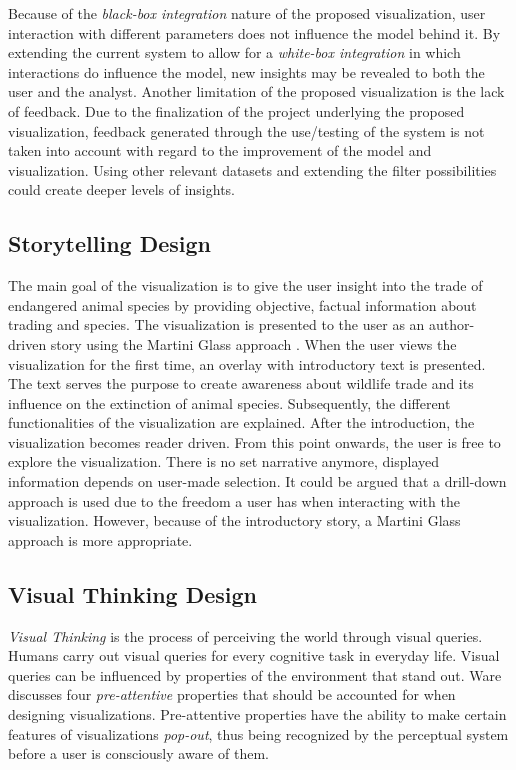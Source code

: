 Because of the \textit{black-box integration} nature of the proposed visualization, user interaction with different parameters does not influence the model behind it. By extending the current system to allow for a \textit{white-box integration} \cite{BertiniInvestigatingDiscovery} in which interactions do influence the model, new insights may be revealed to both the user and the analyst. Another limitation of the proposed visualization is the lack of feedback. Due to the finalization of the project underlying the proposed visualization, feedback generated through the use/testing of the system is not taken into account with regard to the improvement of the model and visualization. Using other relevant datasets and extending the filter possibilities could create deeper levels of insights. 

\subsection{Storytelling Design}
The main goal of the visualization is to give the user insight into the trade of endangered animal species by providing objective, factual information about trading and species. The visualization is presented to the user as an author-driven story using the Martini Glass approach \cite{Segel2010}. When the user views the visualization for the first time, an overlay with introductory text is presented. The text serves the purpose to create awareness about wildlife trade and its influence on the extinction of animal species. Subsequently, the different functionalities of the visualization are explained. After the introduction, the visualization becomes reader driven. From this point onwards, the user is free to explore the visualization. There is no set narrative anymore, displayed information depends on user-made selection. It could be argued that a drill-down approach is used due to the freedom a user has when interacting with the visualization. However, because of the introductory story, a Martini Glass approach is more appropriate. 

\subsection{Visual Thinking Design}
\textit{Visual Thinking} is the process of perceiving the world through visual queries. Humans carry out visual queries for every cognitive task in everyday life. Visual queries can be influenced by properties of the environment that stand out. Ware \cite{Ware2005,Ware2008VisualDesign} discusses four \textit{pre-attentive} properties that should be accounted for when designing visualizations. Pre-attentive properties have the ability to make certain features of visualizations \textit{pop-out}, thus being recognized by the perceptual system before a user is consciously aware of them. 

